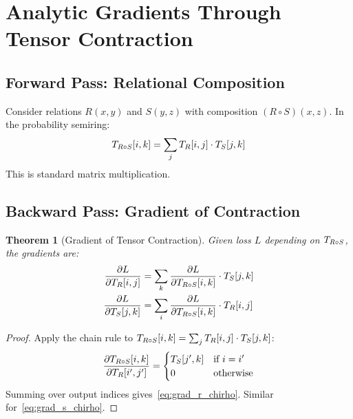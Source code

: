 \documentclass[11pt,a4paper]{article}
\newtheorem{theorem}{Theorem}
\begin{document}
\section{Analytic Gradients Through Tensor Contraction}
\label{sec:gradients_chirho}

\subsection{Forward Pass: Relational Composition}
\label{subsec:forward_chirho}

Consider relations $R(x, y)$ and $S(y, z)$ with composition $(R \circ S)(x, z)$.
In the probability semiring:
\[
T_{R \circ S}[i, k] = \sum_j T_{R}[i, j] \cdot T_{S}[j, k]
\]
This is standard matrix multiplication.

\subsection{Backward Pass: Gradient of Contraction}
\label{subsec:backward_chirho}

\begin{theorem}[Gradient of Tensor Contraction]
\label{thm:contraction_grad_chirho}
Given loss $L$ depending on $T_{R \circ S}$, the gradients are:
\begin{align}
\frac{\partial L}{\partial T_{R}[i, j]} &= \sum_k \frac{\partial L}{\partial T_{R \circ S}[i, k]} \cdot T_{S}[j, k] \label{eq:grad_r_chirho} \\
\frac{\partial L}{\partial T_{S}[j, k]} &= \sum_i \frac{\partial L}{\partial T_{R \circ S}[i, k]} \cdot T_{R}[i, j] \label{eq:grad_s_chirho}
\end{align}
\end{theorem}

\begin{proof}
Apply the chain rule to $T_{R \circ S}[i, k] = \sum_j T_{R}[i, j] \cdot T_{S}[j, k]$:
\[
\frac{\partial T_{R \circ S}[i, k]}{\partial T_{R}[i', j']} = \begin{cases}
T_{S}[j', k] & \text{if } i = i' \\
0 & \text{otherwise}
\end{cases}
\]
Summing over output indices gives~\eqref{eq:grad_r_chirho}. Similar for~\eqref{eq:grad_s_chirho}.
\end{proof}
\end{document}
